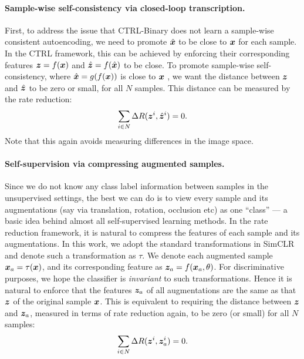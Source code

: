 \documentclass[../../book-main.tex]{subfiles}
\begin{document}
\paragraph{Sample-wise self-consistency via closed-loop transcription.} 
First, to address the issue that CTRL-Binary does not learn a sample-wise consistent autoencoding, we need to promote $\hat {\bm{x}}$ to be close to $\bm{x}$ for each sample. In the CTRL framework, this can be achieved by enforcing their corresponding features $\bm{z}=f(\bm{x})$ and $\hat {\bm{z}} = f(\hat {\bm{x}})$ to be close. 
To promote sample-wise self-consistency, where $\hat{\bm{x}} = g(f(\bm{x}))$ is close to $\bm{x}$ , we want the distance between $\bm{z}$ and $\hat{\bm{z}}$ to be zero or small, for all $N$ samples.
This distance can be measured by the rate reduction:
\begin{align}
\sum_{i\in N} \Delta R(\z^i,\hat{\z}^i) = 0.
\label{eqn:sample-self-consistency}\vspace{-2mm}
\end{align}
Note that this again avoids measuring differences in the image space.

\paragraph{Self-supervision via compressing augmented samples.} 
Since we do not know any class label information between samples in the unsupervised settings, the best we can do is to view every sample and its augmentations (say via translation, rotation,  occlusion etc) as one ``class'' --- a basic idea behind almost all self-supervised learning methods. In the rate reduction framework, it is natural to compress the features of each sample and its augmentations. In this work, we adopt the standard transformations in SimCLR \cite{chen2020simple} and denote such a transformation as $\tau$. We denote each augmented sample $\bm{x}_a = \tau(\bm{x})$, and its corresponding feature as $\bm{z}_a = f(\bm{x}_a, \theta) $. For discriminative purposes, we hope the classifier is {\em invariant} to such transformations. Hence it is natural to enforce that the features $\bm{z}_a$ of all augmentations are the same as that $\bm{z}$ of the original sample $\bm{x}$. This is equivalent to requiring the distance between $\bm{z}$  and  $\bm{z}_a$, measured in terms of rate reduction again, to be zero (or small) for all $N$ samples: 
\begin{align}
\sum_{i\in N} \Delta R(\z^i,\z_{a}^i) = 0.
\label{eqn:sample-compression}\vspace{-3mm}
\end{align}
\end{document}
